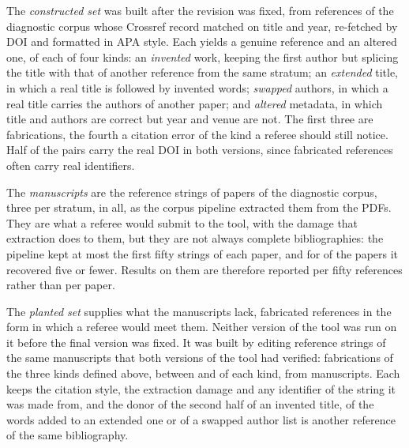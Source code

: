 \documentclass[pdflatex,sn-apa]{sn-jnl}
\begin{document}
The \emph{constructed set} was built after the revision was fixed, from \ConGen{} references of the diagnostic corpus whose Crossref record matched on title and year, re-fetched by DOI and formatted in APA style. Each yields a genuine reference and an altered one, \ConKindN{} of each of four kinds: an \emph{invented} work, keeping the first author but splicing the title with that of another reference from the same stratum; an \emph{extended} title, in which a real title is followed by invented words; \emph{swapped} authors, in which a real title carries the authors of another paper; and \emph{altered} metadata, in which title and authors are correct but year and venue are not. The first three are fabrications, the fourth a citation error of the kind a referee should still notice. Half of the pairs carry the real DOI in both versions, since fabricated references often carry real identifiers.

The \emph{manuscripts} are the reference strings of \CorpMss{} papers of the diagnostic corpus, three per stratum, \CorpRefs{} in all, as the corpus pipeline extracted them from the PDFs. They are what a referee would submit to the tool, with the damage that extraction does to them, but they are not always complete bibliographies: the pipeline kept at most the first fifty strings of each paper, and for \CorpFew{} of the \CorpMss{} papers it recovered five or fewer. Results on them are therefore reported per fifty references rather than per paper.

The \emph{planted set} supplies what the manuscripts lack, fabricated references in the form in which a referee would meet them. Neither version of the tool was run on it before the final version was fixed. It was built by editing reference strings of the same manuscripts that both versions of the tool had verified: \PlantN{} fabrications of the three kinds defined above, between \PlantKindMin{} and \PlantKindMax{} of each kind, from \PlantMss{} manuscripts. Each keeps the citation style, the extraction damage and any identifier of the string it was made from, and the donor of the second half of an invented title, of the words added to an extended one or of a swapped author list is another reference of the same bibliography.
\end{document}
